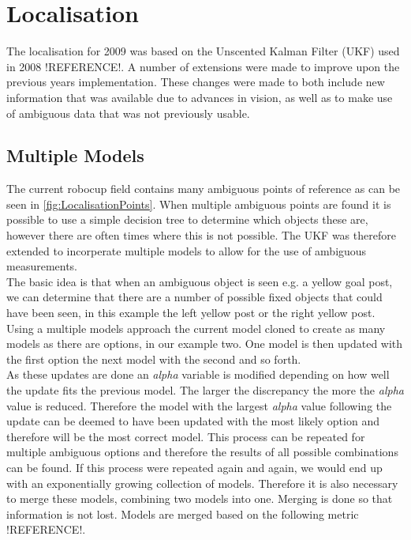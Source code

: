 \section{Localisation}
The localisation for 2009 was based on the Unscented Kalman Filter (UKF) used in 2008 !REFERENCE!. A number of extensions were 
made to improve upon the previous years implementation. These changes were made to both include new information that was available due to advances in vision, as well as to make use of ambiguous data that was not previously usable.\\

\subsection{Multiple Models}
The current robocup field contains many ambiguous points of reference as can be seen in \autoref{fig:LocalisationPoints}. When multiple ambiguous points are found it is possible to use a simple decision tree to determine which objects these are, however there are often times where this is not possible. The UKF was therefore extended to incorperate multiple models to allow for the use of ambiguous measurements.\\

The basic idea is that when an ambiguous object is seen e.g. a yellow goal post, we can determine that there are a number of possible fixed objects that could have been seen, in this example the left yellow post or the right yellow post. Using a multiple models approach the current model cloned to create as many models as there are options, in our example two. One model is then updated with the first option the next model with the second and so forth.\\

As these updates are done an \emph{alpha} variable is modified depending on how well the update fits the previous model. The larger the discrepancy the more the \emph{alpha} value is reduced. Therefore the model with the largest \emph{alpha} value following the update can be deemed to have been updated with the most likely option and therefore will be the most correct model. This process can be repeated for multiple ambiguous options and therefore the results of all possible combinations can be found.
If this process were repeated again and again, we would end up with an exponentially growing collection of models. Therefore it is also necessary to merge these models, combining two models into one. Merging is done so that information is not lost. Models are merged based on the following metric !REFERENCE!.\\

